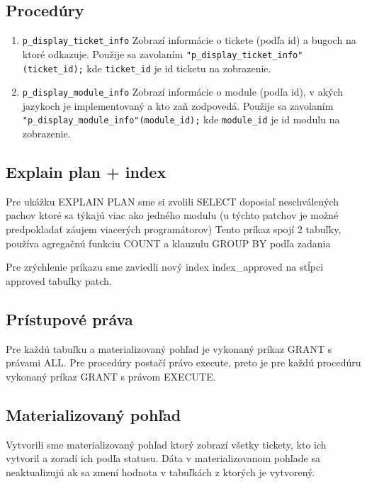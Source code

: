 \documentclass[11pt, a4paper]{article}
\begin{document}
    \subsection{Procedúry}\label{subsec:procedúry}

    \begin{enumerate}
        \item \texttt{p\_display\_ticket\_info}
        Zobrazí informácie o tickete (podľa id) a bugoch na ktoré odkazuje.
        Použije sa zavolaním \texttt{"p\_display\_ticket\_info"(ticket\_id);} kde \texttt{ticket\_id} je id ticketu na zobrazenie.

        \item \texttt{p\_display\_module\_info}
        Zobrazí informácie o module (podľa id), v akých jazykoch je implementovaný a kto zaň zodpovedá.
        Použije sa zavolaním \texttt{"p\_display\_module\_info"(module\_id);} kde \texttt{module\_id} je id modulu na zobrazenie.
    \end{enumerate}

    \subsection{Explain plan + index}\label{subsec:explain-plan-+-index}

    Pre ukážku EXPLAIN PLAN sme si zvolili SELECT doposiaľ neschválených pachov ktoré sa týkajú viac ako jedného modulu (u týchto patchov je možné predpokladať záujem viacerých programátorov)
    Tento príkaz spojí 2 tabuľky, používa agregačnú funkciu COUNT a klauzulu GROUP BY podľa zadania

    Pre zrýchlenie príkazu sme zaviedli nový index index\_approved na stĺpci approved tabuľky patch.

    \subsection{Prístupové práva}\label{subsec:prístupové-práva}

    Pre každú tabuľku a materializovaný pohľad je vykonaný príkaz GRANT s právami ALL.
    Pre procedúry postačí právo execute, preto je pre každú procedúru vykonaný príkaz GRANT s právom EXECUTE.

    \subsection{Materializovaný pohľad}\label{subsec:materializovaný-pohľad}

    Vytvorili sme materializovaný pohľad ktorý zobrazí všetky tickety, kto ich vytvoril a zoradí ich podľa statusu.
    Dáta v materializovanom pohľade sa neaktualizujú ak sa zmení hodnota v tabuľkách z ktorých je vytvorený.
\end{document}
